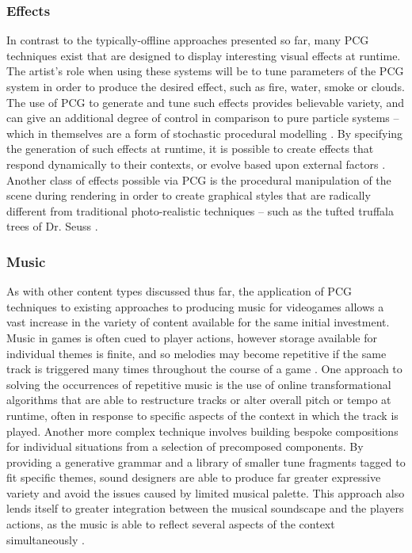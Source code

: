 \documentclass{acm_proc_article-sp}
\begin{document}
\subsubsection{Effects}
In contrast to the typically-offline approaches presented so far, many PCG techniques exist that are designed to display interesting visual effects at runtime. The artist's role when using these systems will be to tune parameters of the PCG system in order to produce the desired effect, such as fire, water, smoke or clouds. The use of PCG to generate and tune such effects provides believable variety, and can give an additional degree of control in comparison to pure particle systems -- which in themselves are a form of stochastic procedural modelling \cite{reeves1983particle}. By specifying the generation of such effects at runtime, it is possible to create effects that respond dynamically to their contexts, or evolve based upon external factors \cite{particles}.
Another class of effects possible via PCG is the procedural manipulation of the scene during rendering in order to create graphical styles that are radically different from traditional photo-realistic techniques -- such as the tufted truffala trees of Dr. Seuss \cite{kowalski1999art}.


\subsubsection{Music}
As with other content types discussed thus far, the application of PCG techniques to existing approaches to producing music for videogames allows a vast increase in the variety of content available for the same initial investment. Music in games is often cued to player actions, however storage available for individual themes is finite, and so melodies may become repetitive if the same track is triggered many times throughout the course of a game \cite{collins2009introduction}. One approach to solving the occurrences of repetitive music is the use of online transformational algorithms that are able to restructure tracks or alter overall pitch or tempo at runtime, often in response to specific aspects of the context in which the track is played. Another more complex technique involves building bespoke compositions for individual situations from a selection of precomposed components. By providing a generative grammar and a library of smaller tune fragments tagged to fit specific themes, sound designers are able to produce far greater expressive variety and avoid the issues caused by limited musical palette. This approach also lends itself to greater integration between the musical soundscape and the players actions, as the music is able to reflect several aspects of the context simultaneously \cite{6266725}.
\end{document}
